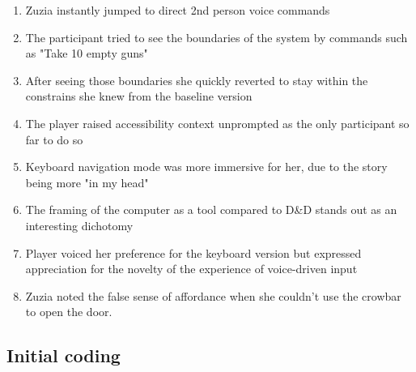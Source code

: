 \begin{enumerate}
    \item Zuzia instantly jumped to direct 2nd person voice commands 
    \item The participant tried to see the boundaries of the system by commands such as "Take 10 empty guns"
    \item After seeing those boundaries she quickly reverted to stay within the constrains she knew from the baseline version
    \item The player raised accessibility context unprompted as the only participant so far to do so 
    \item Keyboard navigation mode was more immersive for her, due to the story being more "in my head"
    \item The framing of the computer as a tool compared to D\&D stands out as an interesting dichotomy 
    \item Player voiced her preference for the keyboard version but expressed appreciation for the novelty of the experience of voice-driven input
    \item Zuzia noted the false sense of affordance when she couldn't use the crowbar to open the door.
 
    
\end{enumerate}

\subsection{Initial coding}

